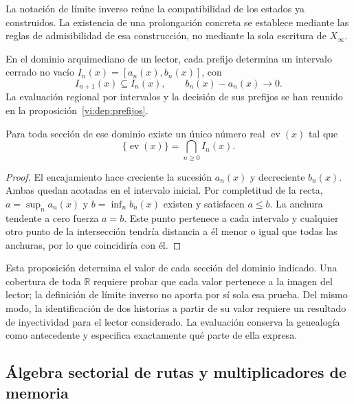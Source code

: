 La notación de límite inverso reúne la compatibilidad de los estados ya
construidos. La existencia de una prolongación concreta se establece
mediante las reglas de admisibilidad de esa construcción, no mediante la
sola escritura de \(X_\infty\).

En el dominio arquimediano de un lector, cada prefijo determina un
intervalo cerrado no vacío \(I_n(x)=[a_n(x),b_n(x)]\), con
\begin{equation}
 I_{n+1}(x)\subseteq I_n(x),\qquad
 b_n(x)-a_n(x)\longrightarrow0.
 \label{vi:hist:cilindros}
\end{equation}
La evaluación regional por intervalos y la decisión de sus prefijos se
han reunido en la proposición~\ref{vi:dep:prefijos}.

\begin{proposition}
Para toda sección de ese dominio existe un único número real
\(\operatorname{ev}(x)\) tal que
\begin{equation}
 \{\operatorname{ev}(x)\}=\bigcap_{n\ge0}I_n(x).
 \label{vi:hist:evaluacion}
\end{equation}
\end{proposition}
\begin{proof}
El encajamiento hace creciente la sucesión \(a_n(x)\) y decreciente
\(b_n(x)\). Ambas quedan acotadas en el intervalo inicial. Por
completitud de la recta, \(a=\sup_n a_n(x)\) y
\(b=\inf_n b_n(x)\) existen y satisfacen \(a\le b\).
La anchura tendente a cero fuerza \(a=b\). Este punto pertenece a cada
intervalo y cualquier otro punto de la intersección tendría distancia a
él menor o igual que todas las anchuras, por lo que coincidiría con él.
\end{proof}

Esta proposición determina el valor de cada sección del dominio indicado.
Una cobertura de toda \(\mathbb R\) requiere probar que cada valor
pertenece a la imagen del lector; la definición de límite inverso no
aporta por sí sola esa prueba. Del mismo modo, la identificación de dos
historias a partir de su valor requiere un resultado de inyectividad
para el lector considerado. La evaluación conserva la genealogía como
antecedente y especifica exactamente qué parte de ella expresa.

\subsection{Álgebra sectorial de rutas y multiplicadores de memoria}
\label{vi:hist:algebra}

